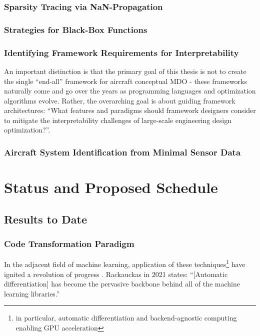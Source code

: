 \documentclass[12pt,vi,oneside]{report}
\begin{document}
    \subsection{Sparsity Tracing via NaN-Propagation}

    \subsection{Strategies for Black-Box Functions}

    \subsection{Identifying Framework Requirements for Interpretability}

    An important distinction is that the primary goal of this thesis is not to create the single ``end-all'' framework for aircraft conceptual MDO - these frameworks naturally come and go over the years as programming languages and optimization algorithms evolve. Rather, the overarching goal is about guiding framework architectures: ``What features and paradigms should framework designers consider to mitigate the interpretability challenges of large-scale engineering design optimization?''.

    \subsection{Aircraft System Identification from Minimal Sensor Data}


    \chapter{Status and Proposed Schedule}
    \label{sec:status}


    \section{Results to Date}
    \label{sec:results}

    \subsection{Code Transformation Paradigm}

    In the adjacent field of machine learning, application of these techniques\footnote{in particular, automatic differentiation and backend-agnostic computing enabling GPU acceleration} have ignited a revolution of progress \cite{baydin_automatic_2018}. Rackauckas in 2021 \cite{rackauckas_generalizing_2021} states: ``[Automatic differentiation] has become the pervasive backbone behind all of the machine learning libraries.''
\end{document}
